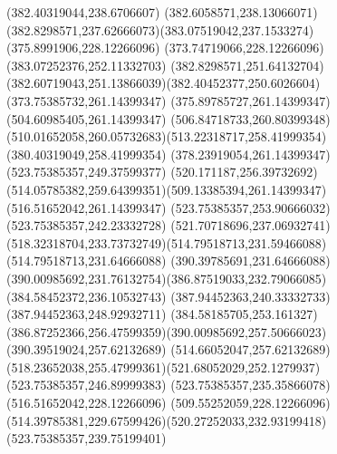 {{	\closepath
	\moveto(382.40319044,238.6706607)
	\curveto(382.6058571,238.13066071)(382.8298571,237.62666073)(383.07519042,237.1533274)
	\lineto(375.8991906,228.12266096)
	\lineto(373.74719066,228.12266096)
	\closepath
	\moveto(383.07252376,252.11332703)
	\curveto(382.8298571,251.64132704)(382.60719043,251.13866039)(382.40452377,250.6026604)
	\lineto(373.75385732,261.14399347)
	\lineto(375.89785727,261.14399347)
	\closepath
	\moveto(504.60985405,261.14399347)
	\curveto(506.84718733,260.80399348)(510.01652058,260.05732683)(513.22318717,258.41999354)
	\lineto(380.40319049,258.41999354)
	\lineto(378.23919054,261.14399347)
	\closepath
	\moveto(523.75385357,249.37599377)
	\curveto(520.171187,256.39732692)(514.05785382,259.64399351)(509.13385394,261.14399347)
	\lineto(516.51652042,261.14399347)
	\lineto(523.75385357,253.90666032)
	\closepath
	\moveto(523.75385357,242.23332728)
	\curveto(521.70718696,237.06932741)(518.32318704,233.73732749)(514.79518713,231.59466088)
	\lineto(514.79518713,231.64666088)
	\lineto(390.39785691,231.64666088)
	\curveto(390.00985692,231.76132754)(386.87519033,232.79066085)(384.58452372,236.10532743)
	\lineto(387.94452363,240.33332733)
	\lineto(387.94452363,248.92932711)
	\lineto(384.58185705,253.161327)
	\curveto(386.87252366,256.47599359)(390.00985692,257.50666023)(390.39519024,257.62132689)
	\lineto(514.66052047,257.62132689)
	\curveto(518.23652038,255.47999361)(521.68052029,252.1279937)(523.75385357,246.89999383)
	\closepath
	\moveto(523.75385357,235.35866078)
	\lineto(516.51652042,228.12266096)
	\lineto(509.55252059,228.12266096)
	\curveto(514.39785381,229.67599426)(520.27252033,232.93199418)(523.75385357,239.75199401)
	\closepath
}
}
{
}

